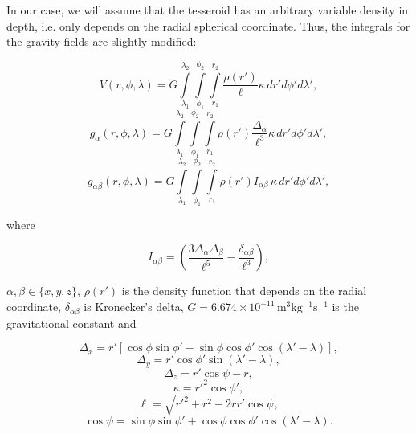 \documentclass[extra]{gji}
\begin{document}
In our case, we will assume that the tesseroid has an arbitrary variable density in depth, i.e. only depends on the radial spherical coordinate.
Thus, the integrals for the gravity fields are slightly modified:

\begin{equation}
    V(r,\phi,\lambda) = G
    \int\limits_{\lambda_1}^{\lambda_2}
    \int\limits_{\phi_1}^{\phi_2}
    \int\limits_{r_1}^{r_2}
    \frac{\rho(r')}{\ell} \kappa \,  dr' d\phi' d\lambda',
\label{eq:tesseroid-pot}
\end{equation}
\begin{equation}
    g_{\alpha}(r,\phi,\lambda) = G
    \int\limits_{\lambda_1}^{\lambda_2}
    \int\limits_{\phi_1}^{\phi_2}
    \int\limits_{r_1}^{r_2}
    \rho(r') \frac{\Delta_\alpha}{\ell^3}
    \kappa \, dr' d\phi' d\lambda',
\label{eq:tesseroid-grav}
\end{equation}
\begin{equation}
    g_{\alpha\beta}(r,\phi,\lambda) = G
    \int\limits_{\lambda_1}^{\lambda_2}
    \int\limits_{\phi_1}^{\phi_2}
    \int\limits_{r_1}^{r_2}
    \rho(r') I_{\alpha\beta} \, \kappa \, dr' d\phi' d\lambda' ,
    \label{eq:tesseroid-tensor}
\end{equation}

\noindent where

\begin{equation}
    I_{\alpha\beta} =
    \left(
        \frac{3\Delta_{\alpha} \Delta_{\beta}}{\ell^5} -
        \frac{\delta_{\alpha\beta}}{\ell^3}
    \right) ,
    \label{eq:tesseroid-tensor-kernel}
\end{equation}

\noindent $\alpha, \beta \in \{x, y, z\}$,
$\rho(r')$ is the density function that depends on the radial coordinate,
$\delta_{\alpha\beta}$ is Kronecker's delta,
$G = 6.674\times10^{-11}\, \text{m$^3$kg$^{-1}$s$^{-1}$}$ is the gravitational constant and

\begin{equation}
    \Delta_x = r'[\cos\phi\sin\phi' - \sin\phi\cos\phi'
               \cos(\lambda' - \lambda)],
\end{equation}
\begin{equation}
    \Delta_y = r' \cos \phi' \sin(\lambda' - \lambda),
\end{equation}
\begin{equation}
    \Delta_z = r' \cos \psi - r,
\end{equation}
\begin{equation}
    \kappa = {r'}^2 \cos \phi',
\end{equation}
\begin{equation}
    \ell = \sqrt{{r'}^2 + r^2 - 2 r r' \cos \psi},
\label{eq:ell}
\end{equation}
\begin{equation}
    \cos\psi = \sin\phi\sin\phi' + \cos\phi\cos\phi'
                 \cos(\lambda' - \lambda).
\label{eq:cospsi}
\end{equation}
\end{document}
